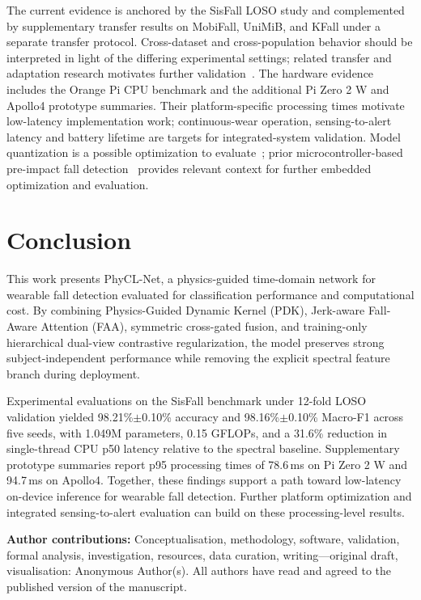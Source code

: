 \documentclass[jec]{acnsart}
\begin{document}
The current evidence is anchored by the SisFall LOSO study and complemented by supplementary transfer results on MobiFall, UniMiB, and KFall under a separate transfer protocol. Cross-dataset and cross-population behavior should be interpreted in light of the differing experimental settings; related transfer and adaptation research motivates further validation~\cite{Jia2024TransferLearningHAR,Wu2024DomainAdaptationContrastive}. The hardware evidence includes the Orange Pi CPU benchmark and the additional Pi Zero 2 W and Apollo4 prototype summaries. Their platform-specific processing times motivate low-latency implementation work; continuous-wear operation, sensing-to-alert latency and battery lifetime are targets for integrated-system validation. Model quantization is a possible optimization to evaluate~\cite{Zhang2023DiffQuant}; prior microcontroller-based pre-impact fall detection~\cite{Benoit2024PreImpactFall} provides relevant context for further embedded optimization and evaluation.

\section{Conclusion}

This work presents PhyCL-Net, a physics-guided time-domain network for wearable fall detection evaluated for classification performance and computational cost. By combining Physics-Guided Dynamic Kernel (PDK), Jerk-aware Fall-Aware Attention (FAA), symmetric cross-gated fusion, and training-only hierarchical dual-view contrastive regularization, the model preserves strong subject-independent performance while removing the explicit spectral feature branch during deployment.

Experimental evaluations on the SisFall benchmark under 12-fold LOSO validation yielded 98.21\%$\pm$0.10\% accuracy and 98.16\%$\pm$0.10\% Macro-F1 across five seeds, with 1.049M parameters, 0.15 GFLOPs, and a 31.6\% reduction in single-thread CPU p50 latency relative to the spectral baseline. Supplementary prototype summaries report p95 processing times of 78.6\,ms on Pi Zero 2 W and 94.7\,ms on Apollo4. Together, these findings support a path toward low-latency on-device inference for wearable fall detection. Further platform optimization and integrated sensing-to-alert evaluation can build on these processing-level results.

\vspace{1em}
\noindent\textbf{Author contributions:} Conceptualisation, methodology, software, validation, formal analysis, investigation, resources, data curation, writing---original draft, visualisation: Anonymous Author(s). All authors have read and agreed to the published version of the manuscript.
\end{document}
